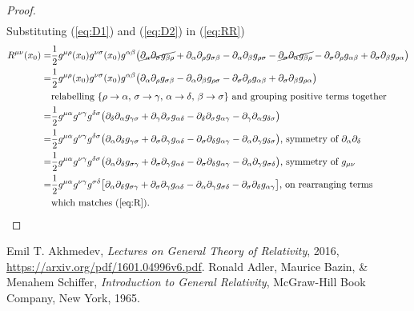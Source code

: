 \documentclass[]{article}
\begin{document}
\begin{proof}
\begin{align*}
	\end{align*}
	Substituting (\ref{eq:D1}) and (\ref{eq:D2}) in (\ref{eq:RR})
	\begin{align*}
	R^{\mu\nu}(x_0)=& \frac{1}{2} g^{\mu\rho}(x_0)g^{\nu\sigma}(x_0)g^{\alpha\beta}\big(\cancel{\partial_{\alpha}\partial_{\sigma}g_{\beta\rho}} + \partial_{\alpha}\partial_{\rho} g_{\sigma\beta} - \partial_{\alpha}\partial_{\beta}g_{\rho\sigma} - \cancel{\partial_{\sigma}\partial_{\alpha}g_{\beta\rho}} - \partial_{\sigma}\partial_{\rho}g_{\alpha\beta} + \partial_{\sigma}\partial_{\beta}g_{\rho\alpha}\big)\\
	=& \frac{1}{2} g^{\mu\rho}(x_0)g^{\nu\sigma}(x_0)g^{\alpha\beta}\big( \partial_{\alpha}\partial_{\rho} g_{\sigma\beta} - \partial_{\alpha}\partial_{\beta}g_{\rho\sigma}  - \partial_{\sigma}\partial_{\rho}g_{\alpha\beta} + \partial_{\sigma}\partial_{\beta}g_{\rho\alpha}\big)\\
	&\text{relabelling } \{\rho\rightarrow \alpha \text{, } \sigma\rightarrow\gamma \text{, } \alpha\rightarrow\delta\text{, } \beta\rightarrow\sigma\} \text{ and grouping positive terms together}\\
	=& \frac{1}{2} g^{\mu\alpha}g^{\nu\gamma}g^{\delta\sigma} \big( \partial_{\delta}\partial_{\alpha}g_{\gamma\sigma} + \partial_{\gamma}\partial_{\sigma}g_{\alpha\delta} - \partial_{\delta}\partial_{\sigma}g_{\alpha\gamma} - \partial_{\gamma}\partial_{\alpha}g_{\delta\sigma}\big)\\
	=& \frac{1}{2} g^{\mu\alpha}g^{\nu\gamma}g^{\delta\sigma} \big( \partial_{\alpha}\partial_{\delta}g_{\gamma\sigma} + \partial_{\sigma}\partial_{\gamma}g_{\alpha\delta} - \partial_{\sigma}\partial_{\delta}g_{\alpha\gamma} - \partial_{\alpha}\partial_{\gamma}g_{\delta\sigma}\big) \text{, symmetry of $\partial_{\alpha}\partial_{\delta}$} \\
	=& \frac{1}{2} g^{\mu\alpha}g^{\nu\gamma}g^{\delta\sigma} \big( \partial_{\alpha}\partial_{\delta}g_{\sigma\gamma} + \partial_{\sigma}\partial_{\gamma}g_{\alpha\delta} - \partial_{\sigma}\partial_{\delta}g_{\alpha\gamma} - \partial_{\alpha}\partial_{\gamma}g_{\sigma\delta}\big) \text {, symmetry of $g_{\mu\nu}$}\\
	= & \frac{1}{2}g^{\mu\alpha}g^{\nu\gamma}g^{\sigma\delta}\big[\partial_{\alpha}\partial_{\delta}g_{\sigma\gamma} + \partial_{\sigma}\partial_{\gamma}g_{\alpha\delta} - \partial_{\alpha}\partial_{\gamma}g_{\sigma\delta} - \partial_{\sigma}\partial_{\delta}g_{\alpha\gamma}\big] \text{, on rearranging terms}\\
	&\text{which matches (\ref{eq:R}).}
	\end{align*}
\end{proof}

\begin{thebibliography}{9}
	
	Emil T. Akhmedev,
	\emph{Lectures on General Theory of Relativity},
	2016,
	\url{https://arxiv.org/pdf/1601.04996v6.pdf}.
	Ronald Adler, Maurice Bazin, \& Menahem Schiffer,
	\emph{Introduction to General Relativity},
	McGraw-Hill Book Company, New York,
	1965.
	
	
\end{thebibliography}
\end{document}
